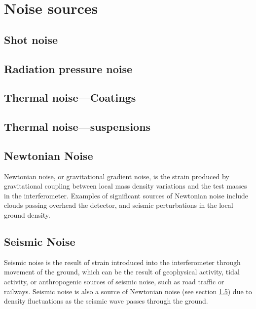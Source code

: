 \documentclass{kentigern}
\begin{document}
\section{Noise sources}
\label{sec:an-overview-noise}

\subsection{Shot noise}
\label{sec:shot-noise}

\subsection{Radiation pressure noise}
\label{sec:radi-press-noise}

\subsection{Thermal noise---Coatings}
\label{sec:therm-noise-coat}

\subsection{Thermal noise---suspensions}
\label{sec:therm-noise-susp}


\subsection{Newtonian Noise}
\label{sec:newtonian-noise}

Newtonian noise, or gravitational gradient noise, is the strain
produced by gravitational coupling between local mass density
variations and the test masses in the interferometer. Examples of
significant sources of Newtonian noise include clouds passing overhead
the detector, and seismic perturbations in the local ground density.

\subsection{Seismic Noise}
\label{sec:seismic-noise}

Seismic noise is the result of strain introduced into the
interferometer through movement of the ground, which can be the result
of geophysical activity, tidal activity, or anthropogenic sources of
seismic noise, such as road traffic or railways. Seismic noise is also
a source of Newtonian noise (see section \ref{sec:newtonian-noise})
due to density fluctuations as the seismic wave passes through the
ground.
\end{document}
